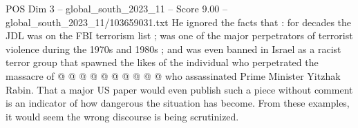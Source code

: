 \begin{textsample}{POS Dim 3 – global\_south\_2023\_11 – Score 9.00 – global\_south\_2023\_11/103659031.txt}
He ignored the facts that : for decades the JDL was on the FBI terrorism list ; was one of the major perpetrators of terrorist violence during the 1970s and 1980s ; and was even banned in Israel as a racist terror group that spawned the likes of the individual who perpetrated the massacre of @ @ @ @ @ @ @ @ @ @ who assassinated Prime Minister Yitzhak Rabin.
That a major US paper would even publish such a piece without comment is an indicator of how dangerous the situation has become.
From these examples, it would seem the wrong discourse is being scrutinized.

\end{textsample}
